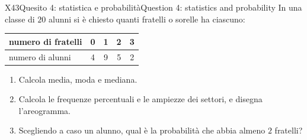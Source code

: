 \begin{esercizio}{X4}{3}{Quesito 4: statistica e probabilità}{Question 4: statistics and probability}
In una classe di $20$ alunni si è chiesto quanti fratelli o sorelle ha ciascuno:
\begin{center}
\begin{tabular}{l|cccc}
numero di fratelli & 0 & 1 & 2 & 3\\ \hline
numero di alunni & 4 & 9 & 5 & 2
\end{tabular}
\end{center}
\begin{enumerate}
\item Calcola media, moda e mediana. 
\item Calcola le frequenze percentuali e le ampiezze dei settori, e disegna l'areogramma. 
\item Scegliendo a caso un alunno, qual è la probabilità che abbia almeno $2$ fratelli? 
\end{enumerate}
\end{esercizio}
